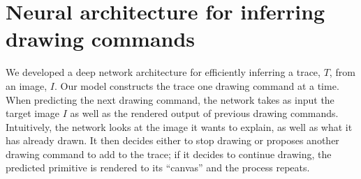 \documentclass{article}
\newcommand{\remark}[1]{\textcolor{red}{[#1]}}
\begin{document}




\section{Neural architecture for inferring drawing commands}\label{neuralNetworkSection}

We developed a deep network architecture for efficiently inferring a
trace, $T$, from an image, $I$.  Our model constructs the
trace one drawing command at a time.  When predicting the next drawing
command, the network takes as input the target image $I$ as well as
the rendered output of previous drawing commands.  Intuitively, the
network looks at the image it wants to explain, as well as what it has
already drawn.  It then decides either to stop drawing or proposes
another drawing command to add to the trace; if it decides
to continue drawing, the predicted primitive is rendered to its
``canvas'' and the process repeats.
\end{document}
